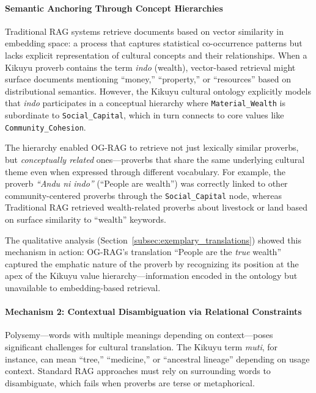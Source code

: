 \paragraph{Semantic Anchoring Through Concept Hierarchies}

Traditional RAG systems retrieve documents based on vector similarity in embedding space: a process that captures statistical co-occurrence patterns but lacks explicit representation of cultural concepts and their relationships. When a Kikuyu proverb contains the term \emph{indo} (wealth), vector-based retrieval might surface documents mentioning ``money,'' ``property,'' or ``resources'' based on distributional semantics. However, the Kikuyu cultural ontology explicitly models that \emph{indo} participates in a conceptual hierarchy where \texttt{Material\_Wealth} is subordinate to \texttt{Social\_Capital}, which in turn connects to core values like \texttt{Community\_Cohesion}.

The hierarchy enabled OG-RAG to retrieve not just lexically similar proverbs, but \emph{conceptually related} ones—proverbs that share the same underlying cultural theme even when expressed through different vocabulary. For example, the proverb \emph{``Andu ni indo''} (``People are wealth'') was correctly linked to other community-centered proverbs through the \texttt{Social\_Capital} node, whereas Traditional RAG retrieved wealth-related proverbs about livestock or land based on surface similarity to ``wealth'' keywords.

The qualitative analysis (Section~\ref{subsec:exemplary_translations}) showed this mechanism in action: OG-RAG's translation ``People are the \emph{true} wealth'' captured the emphatic nature of the proverb by recognizing its position at the apex of the Kikuyu value hierarchy—information encoded in the ontology but unavailable to embedding-based retrieval.

\paragraph{Mechanism 2: Contextual Disambiguation via Relational Constraints}

Polysemy—words with multiple meanings depending on context—poses significant challenges for cultural translation. The Kikuyu term \emph{muti}, for instance, can mean ``tree,'' ``medicine,'' or ``ancestral lineage'' depending on usage context. Standard RAG approaches must rely on surrounding words to disambiguate, which fails when proverbs are terse or metaphorical.

